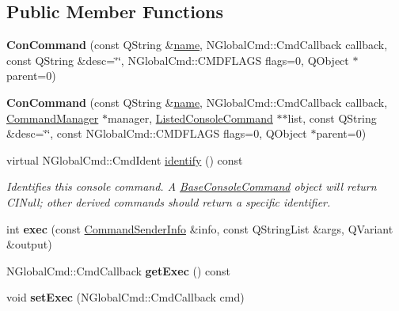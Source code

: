 \subsection*{Public Member Functions}
\begin{DoxyCompactItemize}
\item 
\hypertarget{class_con_command_abd8a6c4780d77aa59f46233ac818e0e1}{{\bfseries Con\-Command} (const Q\-String \&\hyperlink{class_base_console_command_a2f21764f46a3864a362eae2e3396e363}{name}, N\-Global\-Cmd\-::\-Cmd\-Callback callback, const Q\-String \&desc=\char`\"{}\char`\"{}, N\-Global\-Cmd\-::\-C\-M\-D\-F\-L\-A\-G\-S flags=0, Q\-Object $\ast$parent=0)}\label{class_con_command_abd8a6c4780d77aa59f46233ac818e0e1}

\item 
\hypertarget{class_con_command_a8b048f3b99fdd95b2c4e26c2a0a117be}{{\bfseries Con\-Command} (const Q\-String \&\hyperlink{class_base_console_command_a2f21764f46a3864a362eae2e3396e363}{name}, N\-Global\-Cmd\-::\-Cmd\-Callback callback, \hyperlink{class_command_manager}{Command\-Manager} $\ast$manager, \hyperlink{class_listed_console_command}{Listed\-Console\-Command} $\ast$$\ast$list, const Q\-String \&desc=\char`\"{}\char`\"{}, const N\-Global\-Cmd\-::\-C\-M\-D\-F\-L\-A\-G\-S flags=0, Q\-Object $\ast$parent=0)}\label{class_con_command_a8b048f3b99fdd95b2c4e26c2a0a117be}

\item 
virtual N\-Global\-Cmd\-::\-Cmd\-Ident \hyperlink{class_con_command_ab287443a9615df46739d0c39b096016e}{identify} () const 
\begin{DoxyCompactList}\small\item\em Identifies this console command. A \hyperlink{class_base_console_command}{Base\-Console\-Command} object will return C\-I\-Null; other derived commands should return a specific identifier. \end{DoxyCompactList}\item 
\hypertarget{class_con_command_af6d7e9c4e0b654f0b3e9a34cb5b22179}{int {\bfseries exec} (const \hyperlink{class_command_sender_info}{Command\-Sender\-Info} \&info, const Q\-String\-List \&args, Q\-Variant \&output)}\label{class_con_command_af6d7e9c4e0b654f0b3e9a34cb5b22179}

\item 
\hypertarget{class_con_command_a7ff5a03d8a8a6ab7badaef4ffd083714}{N\-Global\-Cmd\-::\-Cmd\-Callback {\bfseries get\-Exec} () const }\label{class_con_command_a7ff5a03d8a8a6ab7badaef4ffd083714}

\item 
\hypertarget{class_con_command_a3ae23385874e68d3e72ef50d0baf2ade}{void {\bfseries set\-Exec} (N\-Global\-Cmd\-::\-Cmd\-Callback cmd)}\label{class_con_command_a3ae23385874e68d3e72ef50d0baf2ade}

\end{DoxyCompactItemize}

